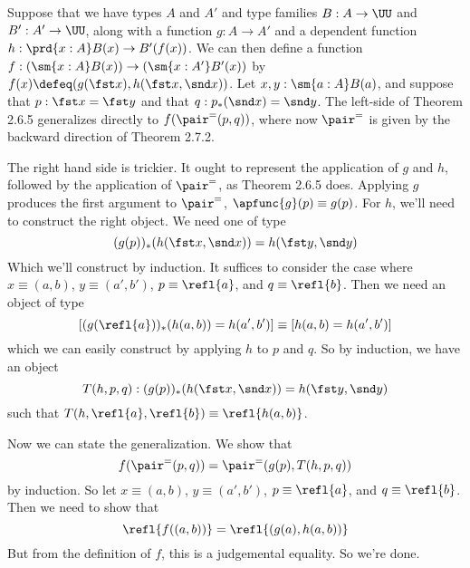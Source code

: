  \soln
Suppose that we have types $A$ and $A'$ and type families $B:A\to\UU$ and
$B':A'\to\UU$, along with a function $g:A \to A'$ and a dependent function
$h:\prd{x:A} B(x) \to B'(f(x))$.  We can then define a function $f :
(\sm{x:A}B(x)) \to (\sm{x:A'}B'(x))$ by $f(x) \defeq (g(\fst x), h(\fst x, \snd
x))$.  
Let $x, y : \sm{a:A}B(a)$, and 
suppose that $p : \fst x = \fst y$ and that $q : p_{*}(\snd x) =
\snd y$.  The left-side of Theorem 2.6.5 generalizes directly to
$f(\pair^{=}(p, q))$, where now $\pair^{=}$ is given by the backward direction
of Theorem 2.7.2.  


The right hand side is trickier.  It ought to represent the application of $g$
and $h$, followed by the application of $\pair^{=}$, as Theorem 2.6.5 does.
Applying $g$ produces the first argument to $\pair^{=}$, $\apfunc{g}(p) \equiv
g(p)$.  For $h$, we'll need to construct the right object.  We need one of type
\[
  (g(p))_{*}(h(\fst x, \snd x)) = h(\fst y, \snd y)
\]
Which we'll construct by induction.  It suffices to consider the case where $x
\equiv (a, b)$, $y \equiv (a', b')$, $p \equiv \refl{a}$, and $q \equiv
\refl{b}$.  Then we need an object of type
\[
  \left[(g(\refl{a}))_{*}(h(a, b)) = h(a', b')\right]
  \equiv
  \left[h(a, b) = h(a', b')\right]
\]
which we can easily construct by applying $h$ to $p$ and $q$.  So by induction, we have an object
\[
  T(h, p, q) : 
  (g(p))_{*}(h(\fst x, \snd x)) = h(\fst y, \snd y)
\]
such that $T(h, \refl{a}, \refl{b}) \equiv \refl{h(a, b)}$.


Now we can state the generalization.  We show that
\[
  f(\pair^{=}(p, q)) = \pair^{=}(g(p), T(h, p, q))
\]
by induction.  So let $x \equiv (a, b)$, $y \equiv (a', b')$, $p
\equiv \refl{a}$, and $q \equiv \refl{b}$.  Then we need to show that
\[
  \refl{f((a, b))} = \refl{(g(a), h(a, b))}
\]
But from the definition of $f$, this is a judgemental equality.  So we're done.


